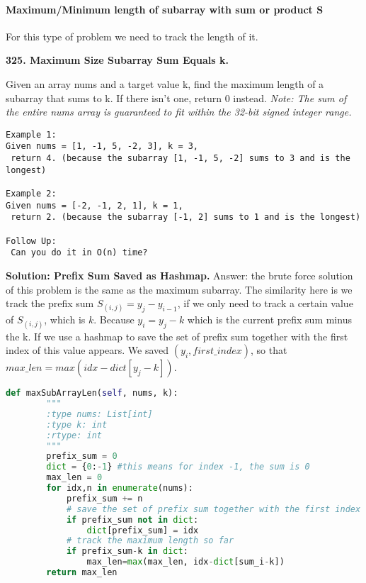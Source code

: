 \documentclass[../main.tex]{subfiles}
\begin{document}
\paragraph{Maximum/Minimum length of subarray with sum or product S}
For this type of problem we need to track the length of it. 

\begin{examples}[resume]
\item \textbf{325. Maximum Size Subarray Sum Equals k.}

Given an array nums and a target value k, find the maximum length of a subarray that sums to k. If there isn’t one, return 0 instead. \textit{Note:
 The sum of the entire nums array is guaranteed to fit within the 32-bit signed integer range.}

\begin{lstlisting}[numbers=none]
Example 1:
Given nums = [1, -1, 5, -2, 3], k = 3,
 return 4. (because the subarray [1, -1, 5, -2] sums to 3 and is the longest)

Example 2:
Given nums = [-2, -1, 2, 1], k = 1,
 return 2. (because the subarray [-1, 2] sums to 1 and is the longest)

Follow Up:
 Can you do it in O(n) time?
 \end{lstlisting}
 
\textbf{Solution: Prefix Sum Saved as Hashmap.} 
Answer: the brute force solution of this problem is the same as the maximum subarray. The similarity here is we track the prefix sum $S_{(i,j)} = y_j - y_{i-1}$, if we only need to track a certain value of $S_{(i,j)}$, which is $k$. Because $y_i = y_j - k$ which is the current prefix sum minus the k. If we use a hashmap to save the set of prefix sum together with the first index of this value appears. We saved $(y_i, first\_index)$, so that $max\_len = max(idx-dict[y_j-k])$. 
\begin{lstlisting}[language = Python]
def maxSubArrayLen(self, nums, k):
        """
        :type nums: List[int]
        :type k: int
        :rtype: int
        """
        prefix_sum = 0
        dict = {0:-1} #this means for index -1, the sum is 0
        max_len = 0
        for idx,n in enumerate(nums):
            prefix_sum += n
            # save the set of prefix sum together with the first index of this value appears. 
            if prefix_sum not in dict: 
                dict[prefix_sum] = idx
            # track the maximum length so far
            if prefix_sum-k in dict:
                max_len=max(max_len, idx-dict[sum_i-k])
        return max_len
\end{lstlisting}


\end{examples}
\end{document}
